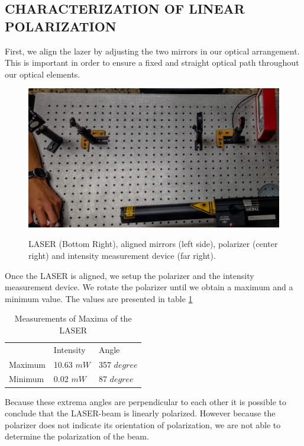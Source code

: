 \label{sec:RESULTS}

\subsection{CHARACTERIZATION OF LINEAR POLARIZATION}
First, we align the lazer by adjusting the two mirrors in our optical arrangement. This is important in order to ensure a fixed and straight optical path throughout our optical elements.\\

\begin{figure}[H]
    \centering
    \includegraphics[scale=0.14]{Figures/Polarization_1setup.jpg}
    \label{fig:Setup1}
    \caption{LASER (Bottom Right), aligned mirrors (left side), polarizer (center right) and intensity measurement device (far right).}
\end{figure}

Once the LASER is aligned, we setup the polarizer and the intensity measurement device. We rotate the polarizer until we obtain a maximum and a minimum value. The values are presented in table \ref{Tab:LPs}\\ 

\begin{table}[H]
\begin{center}
\begin{tabular}{|l|l|l|}
        & Intensity  & Angle        \\
Maximum & 10.63 $mW$ & 357 $degree$ \\
Minimum & 0.02 $mW$  & 87 $degree$ 
\end{tabular}
\label{Tab:LPs}
\caption{Measurements of Maxima of the LASER}
\end{center}
\end{table}

Because these extrema angles are perpendicular to each other it is possible to conclude that the LASER-beam is linearly polarized. However because the polarizer does not indicate its orientation of polarization, we are not able to determine the polarization of the beam.  \\


